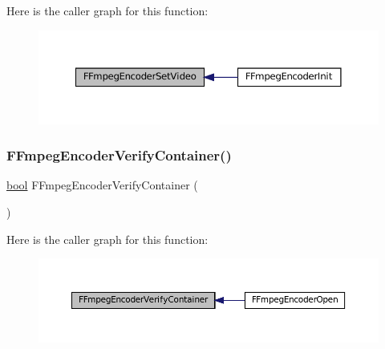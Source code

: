 Here is the caller graph for this function\+:
\nopagebreak
\begin{figure}[H]
\begin{center}
\leavevmode
\includegraphics[width=350pt]{ffmpeg-encoder_8h_a917d76068b01c4cc7cccba88bc34afbe_icgraph}
\end{center}
\end{figure}
\mbox{\label{ffmpeg-encoder_8h_a66a59837fe117bd0a630ca71fe3cf522}} 
\subsubsection{\texorpdfstring{F\+Fmpeg\+Encoder\+Verify\+Container()}{FFmpegEncoderVerifyContainer()}}
{\footnotesize\ttfamily \mbox{\hyperlink{libretro_8h_a4a26dcae73fb7e1528214a068aca317e}{bool}} F\+Fmpeg\+Encoder\+Verify\+Container (\begin{DoxyParamCaption}\item[{struct \mbox{\hyperlink{ffmpeg-encoder_8h_struct_f_fmpeg_encoder}{F\+Fmpeg\+Encoder}} $\ast$}]{ }\end{DoxyParamCaption})}

Here is the caller graph for this function\+:
\nopagebreak
\begin{figure}[H]
\begin{center}
\leavevmode
\includegraphics[width=350pt]{ffmpeg-encoder_8h_a66a59837fe117bd0a630ca71fe3cf522_icgraph}
\end{center}
\end{figure}
